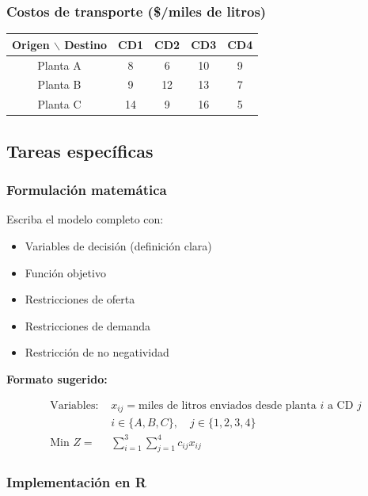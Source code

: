 \documentclass[12pt,a4paper]{article}
\begin{document}
	\subsubsection{Costos de transporte (\$/miles de litros)}
	
	\begin{table}[H]
		\centering
		\begin{tabular}{|c|cccc|}
			\hline
			\textbf{Origen $\backslash$ Destino} & CD1 & CD2 & CD3 & CD4 \\
			\hline
			Planta A & 8 & 6 & 10 & 9 \\
			Planta B & 9 & 12 & 13 & 7 \\
			Planta C & 14 & 9 & 16 & 5 \\
			\hline
		\end{tabular}
	\end{table}
	
	\subsection{Tareas específicas}
	
	\subsubsection{Formulación matemática}
	
	Escriba el modelo completo con:
	
	\begin{itemize}
		\item Variables de decisión (definición clara)
		\item Función objetivo
		\item Restricciones de oferta %
		\item Restricciones de demanda %
		\item Restricción de no negatividad
	\end{itemize}
	
	\noindent \textbf{Formato sugerido:}
	
	\begin{align}
		\text{Variables: } & x_{ij} = \text{miles de litros enviados desde planta } i \text{ a CD } j \\
		& i \in \{A, B, C\}, \quad j \in \{1, 2, 3, 4\} \\
		\text{Min } Z = & \sum_{i=1}^{3}\sum_{j=1}^{4} c_{ij}x_{ij}
	\end{align}
	
	\subsubsection{Implementación en R}
	
\end{document}
